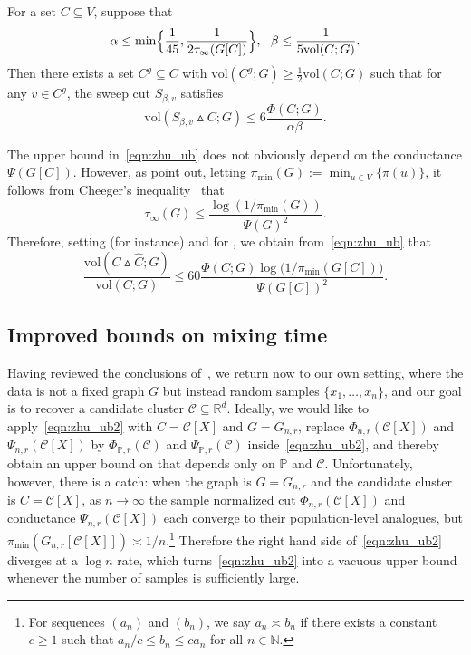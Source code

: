 \documentclass[11pt,twoside]{article}
\newcommand{\Reals}{\mathbb{R}}
\newcommand{\1}{\mathbf{1}}
\newcommand{\Rd}{\Reals^d}
\newcommand{\mc}[1]{\mathcal{#1}}
\newcommand{\mbb}[1]{\mathbb{#1}}
\newcommand{\Pbb}{\mathbb{P}}
\newcommand{\wh}[1]{\widehat{#1}}
\newcommand{\vol}{\mathrm{vol}}
\begin{document}
\begin{lemma}
	\label{lem:zhu}
	For a set $C \subseteq V$, suppose that
	\begin{equation}
	\label{eqn:zhu_condition}
	\alpha \leq \min\Bigl\{\frac{1}{45}, \frac{1}{2\tau_{\infty}(G[C])}\Bigr\},~~ \beta \leq \frac{1}{5\vol(C;G)}.
	\end{equation}
	Then there exists a set $C^g \subseteq C$ with $\vol(C^g;G) \geq \frac{1}{2}\vol(C;G)$ such that for any $v \in C^g$, the sweep cut $S_{\beta,v}$ satisfies
	\begin{equation}
	\label{eqn:zhu_ub}
	\vol(S_{\beta,v} \vartriangle C;G) \leq 6\frac{\Phi(C;G)}{\alpha \beta}.
	\end{equation}
\end{lemma}
The upper bound in~\eqref{eqn:zhu_ub} does not obviously depend on the conductance $\Psi(G[C])$. However, as \cite{zhu2013} point out, letting $\pi_{\min}(G) := \min_{u \in V}\{\pi(u)\}$, it follows from Cheeger's inequality~\citep{chung1997} that 
\begin{equation}
\label{eqn:mixing_time_cheeger}
\tau_{\infty}(G) \leq \frac{\log(1/\pi_{\min}(G))}{\Psi(G)^2}.
\end{equation}
Therefore, setting (for instance)  and \smash{$\wh{C} = S_{\beta_0,v}$} for \smash{$\beta_0 = \frac{1}{5 \vol(C;G)}$}, we obtain from~\eqref{eqn:zhu_ub} that 
\begin{equation}
\label{eqn:zhu_ub2}
\frac{\vol(C \vartriangle \wh{C};G)}{\vol(C; G)} \leq 60\frac{\Phi(C;G) \log\bigl( 1/\pi_{\min}(G[C])\bigr)}{\Psi(G[C])^2}.
\end{equation}

\subsection{Improved bounds on mixing time} 
\label{subsec:mixing_time}
Having reviewed the conclusions of~\cite{zhu2013}, we return now to our own setting, where the data is not a fixed graph $G$ but instead random samples $\{x_1,\ldots,x_n\}$, and our goal is to recover a candidate cluster $\mc{C} \subseteq \Rd$. Ideally, we would like to apply~\eqref{eqn:zhu_ub2} with $C = \mc{C}[X]$ and $G = G_{n,r}$, replace $\Phi_{n,r}(\mc{C}[X])$ and $\Psi_{n,r}(\mc{C}[X])$ by $\Phi_{\Pbb,r}(\mc{C})$ and $\Psi_{\Pbb,r}(\mc{C})$ inside~\eqref{eqn:zhu_ub2}, and thereby obtain an upper bound on \smash{$\Delta(\wh{C};\mc{C}[X])$} that depends only on $\Pbb$ and $\mc{C}$. Unfortunately, however, there is a catch: when the graph is $G = G_{n,r}$ and the candidate cluster is $C = \mc{C}[X]$, as $n \to \infty$ the sample normalized cut $\Phi_{n,r}(\mc{C}[X])$ and conductance $\Psi_{n,r}(\mc{C}[X])$ each converge to their population-level analogues, but $\pi_{\min}(G_{n,r}[\mc{C}[X]]) \asymp 1/n$.\footnote{For sequences $(a_n)$ and $(b_n)$, we say $a_n \asymp b_n$ if there exists a constant $c \geq 1$ such that $a_n/c \leq b_n \leq c a_n$ for all $n \in \mbb{N}$.} Therefore the right hand side of~\eqref{eqn:zhu_ub2} diverges at a $\log n$ rate, which turns~\eqref{eqn:zhu_ub2} into a vacuous upper bound whenever the number of samples is sufficiently large.
\end{document}
